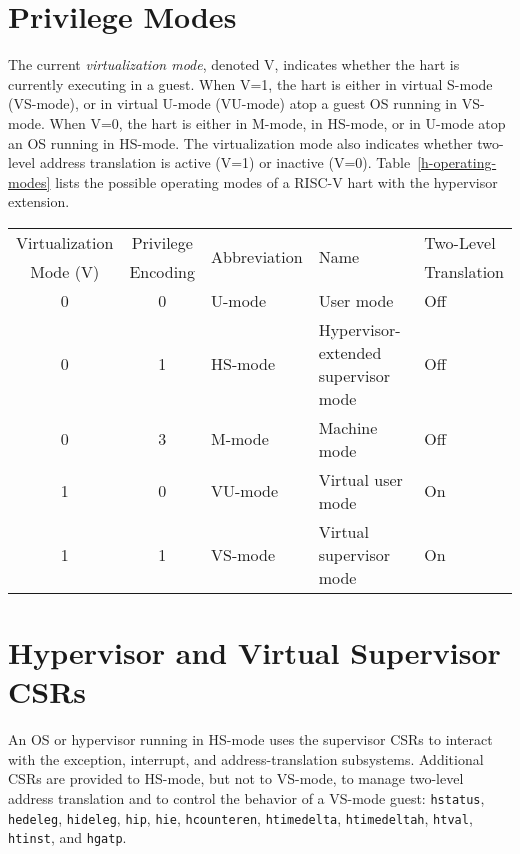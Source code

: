 \section{Privilege Modes}

The current {\em virtualization mode}, denoted V, indicates whether the hart
is currently executing in a guest.
When V=1, the hart is either in virtual S-mode (VS-mode), or in virtual U-mode
(VU-mode) atop a guest OS running in VS-mode.
When V=0, the hart is either in M-mode, in HS-mode, or in U-mode atop an OS
running in HS-mode.
The virtualization mode also indicates whether two-level address translation
is active (V=1) or inactive (V=0).  Table~\ref{h-operating-modes} lists the
possible operating modes of a RISC-V hart with the hypervisor extension.

\begin{table*}[h!]
\begin{center}
\begin{tabular}{|c|c||l|l|l|}
  \hline
   Virtualization & Privilege & \multirow{2}{*}{Abbreviation} & \multirow{2}{*}{Name} & Two-Level \\
   Mode (V)       & Encoding  &                               &                       & Translation \\ \hline
   0              & 0         & U-mode  & User mode & Off \\
   0              & 1         & HS-mode & Hypervisor-extended supervisor mode & Off \\
   0              & 3         & M-mode  & Machine mode & Off \\
  \hline
   1              & 0         & VU-mode & Virtual user mode & On \\
   1              & 1         & VS-mode & Virtual supervisor mode & On \\
  \hline
 \end{tabular}
\end{center}
\caption{Operating modes with the hypervisor extension.}
\label{h-operating-modes}
\end{table*}

\section{Hypervisor and Virtual Supervisor CSRs}

An OS or hypervisor running in HS-mode uses the supervisor CSRs to interact with the exception,
interrupt, and address-translation subsystems.
Additional CSRs are provided to HS-mode, but not to VS-mode, to manage
two-level address translation and to control the behavior of a VS-mode guest:
{\tt hstatus}, {\tt hedeleg}, {\tt hideleg}, {\tt hip}, {\tt hie},
{\tt hcounteren}, {\tt htimedelta}, {\tt htimedeltah}, {\tt htval},
{\tt htinst}, and {\tt hgatp}.

